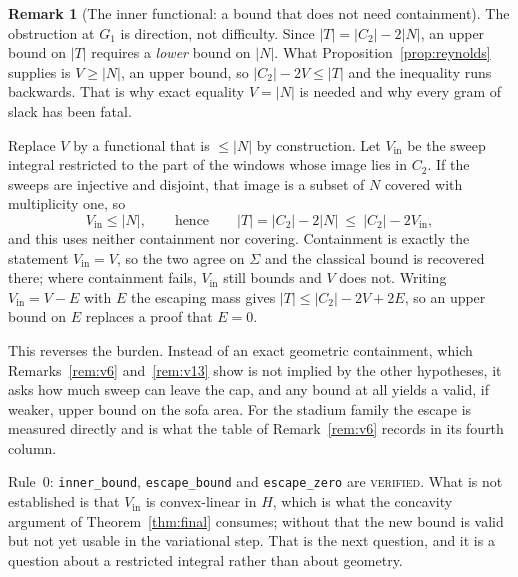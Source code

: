 \documentclass[11pt]{article}
\theoremstyle{definition}
\newtheorem{remark}[theorem]{Remark}
\newcommand{\Sig}{\Sigma}
\begin{document}
\begin{remark}[The inner functional: a bound that does not need containment]\label{rem:v16}
The obstruction at $G_1$ is direction, not difficulty. Since $|T|=|C_2|-2|N|$, an upper bound
on $|T|$ requires a \emph{lower} bound on $|N|$. What Proposition~\ref{prop:reynolds} supplies
is $V\ge|N|$, an upper bound, so $|C_2|-2V\le|T|$ and the inequality runs backwards. That is
why exact equality $V=|N|$ is needed and why every gram of slack has been fatal.

Replace $V$ by a functional that is $\le|N|$ by construction. Let $V_{\mathrm{in}}$ be the
sweep integral restricted to the part of the windows whose image lies in $C_2$. If the sweeps
are injective and disjoint, that image is a subset of $N$ covered with multiplicity one, so
\[
  V_{\mathrm{in}}\le|N| ,\qquad\text{hence}\qquad |T|=|C_2|-2|N|\ \le\ |C_2|-2V_{\mathrm{in}} ,
\]
and this uses neither containment nor covering. Containment is exactly the statement
$V_{\mathrm{in}}=V$, so the two agree on $\Sig$ and the classical bound is recovered there;
where containment fails, $V_{\mathrm{in}}$ still bounds and $V$ does not. Writing
$V_{\mathrm{in}}=V-E$ with $E$ the escaping mass gives $|T|\le|C_2|-2V+2E$, so an upper bound
on $E$ replaces a proof that $E=0$.

This reverses the burden. Instead of an exact geometric containment, which
Remarks~\ref{rem:v6} and~\ref{rem:v13} show is not implied by the other hypotheses, it asks
how much sweep can leave the cap, and any bound at all yields a valid, if weaker, upper bound
on the sofa area. For the stadium family the escape is measured directly and is what the
table of Remark~\ref{rem:v6} records in its fourth column.

Rule~0: \verb|inner_bound|, \verb|escape_bound| and \verb|escape_zero| are \textsc{verified}.
What is not established is that $V_{\mathrm{in}}$ is convex-linear in $H$, which is what the
concavity argument of Theorem~\ref{thm:final} consumes; without that the new bound is valid
but not yet usable in the variational step. That is the next question, and it is a question
about a restricted integral rather than about geometry.
\end{remark}
\end{document}
